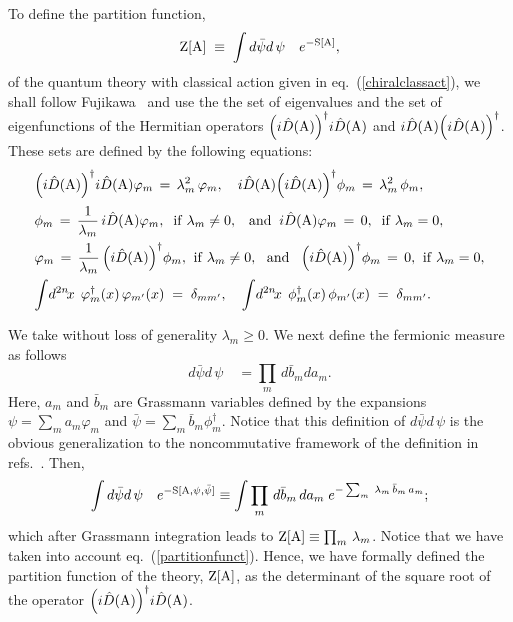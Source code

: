 \documentclass[a4paper,12pt]{article}
\def\A{{\rm A}}
\def\Z{{\rm Z}}
\def\idxn{\int\! d^{2n}\!x \,}
\def\ds{\displaystyle}
\begin{document}
To define the partition function, 
\begin{equation}
\Z[\A] \;\equiv\;\int  d\bar{\psi}d\,\psi\quad e^{-{\rm S}[\A]},
\label{partitionfunct}
\end{equation}
of the quantum theory with classical action given in 
eq.~(\ref{chiralclassact}), we shall follow Fujikawa~\cite{Fujikawa:1984bg} and use the
the set of eigenvalues and the set of eigenfunctions of the Hermitian 
operators  
$\Big(i\hat{D}(\A)\Big)^{\dagger}i\hat{D}(\A)$ and 
$i\hat{D}(\A) \Big(i\hat{D}(\A)\Big)^{\dagger}$. These sets are defined by
the following equations:
\begin{equation}
\begin{array}{l}
{\ds \Big(i\hat{D}(\A)\Big)^{\dagger}i\hat{D}(\A)\varphi_m\,=\,\lambda^2_m\,
\varphi_m,\quad i\hat{D}(\A) \Big(i\hat{D}(\A)\Big)^{\dagger}\phi_m\,=\,
\lambda^2_m\,\phi_m,}\\[9pt]
{\ds \phi_m\,=\,\frac{1}{\lambda_m}\,i\hat{D}(\A)\varphi_m,\;\;{\rm  if}\;
\lambda_m\neq 0,\;\;\; {\rm and}\;\; i\hat{D}(\A)\varphi_m\,=\,0,\;\;{\rm if}\;
\lambda_m =0},\\[9pt]
{\ds \varphi_m\,=\,\frac{1}{\lambda_m}\,\Big(i\hat{D}(\A)\Big)^{\dagger}\phi_m,\;\;}{\rm if}\;
{\ds\lambda_m\neq 0,}\;\;\; {\rm and}\;\;{\ds \;\Big(i\hat{D}(\A)\Big)^{\dagger}\phi_m\,=\,0,\;\;}{\rm if}\;
{\ds\lambda_m =0},\\[9pt]
{\ds \idxn\; \varphi_m^{\dagger}(x)\,\varphi_{m'}(x)\;=\;\delta_{mm'},\quad
 \idxn\; \phi_m^{\dagger}(x)\,\phi_{m'}(x)\;=\;\delta_{mm'}.}\\[9pt]
\end{array}
\label{definitions}
\end{equation}
We take without loss of generality $\lambda_{m}\geq 0$. We next define the 
fermionic measure as follows
\begin{equation}
d\bar{\psi}d\,\psi\quad=\prod_m\,d\bar{b}_m da_{m}.
\label{measure}
\end{equation}
Here,    
$a_m$ and $\bar{b}_m$ are Grassmann variables defined by the expansions
$\psi=\sum_{m}a_m\varphi_m$ and $\bar{\psi}=\sum_{m}\bar{b}_m\phi_m^{\dagger}$.
Notice that this definition of $d\bar{\psi}d\,\psi$ is the obvious 
generalization to the noncommutative framework of the definition in 
refs.~\cite{Banerjee:1986bu, Banerjee:1999up}. Then, 
\begin{displaymath}
\int  d\bar{\psi}d\,\psi\quad e^{-{\rm S}[\A,\psi,\bar{\psi}]}\equiv 
\int \prod_m\,d\bar{b}_m\,da_m\;e^{-\sum_m\;\lambda_m\,\bar{b}_m\,a_m};
\end{displaymath}
which after Grassmann integration leads to 
$\Z[\A]\equiv \prod_m\,\lambda_m$. Notice that we have taken into account 
eq.~(\ref{partitionfunct}). Hence, we have formally defined the 
partition function of the theory, $\Z[\A]$, as the determinant of the 
square root of the operator  
$\Big(i\hat{D}(\A)\Big)^{\dagger}i\hat{D}(\A)$. 
\end{document}
